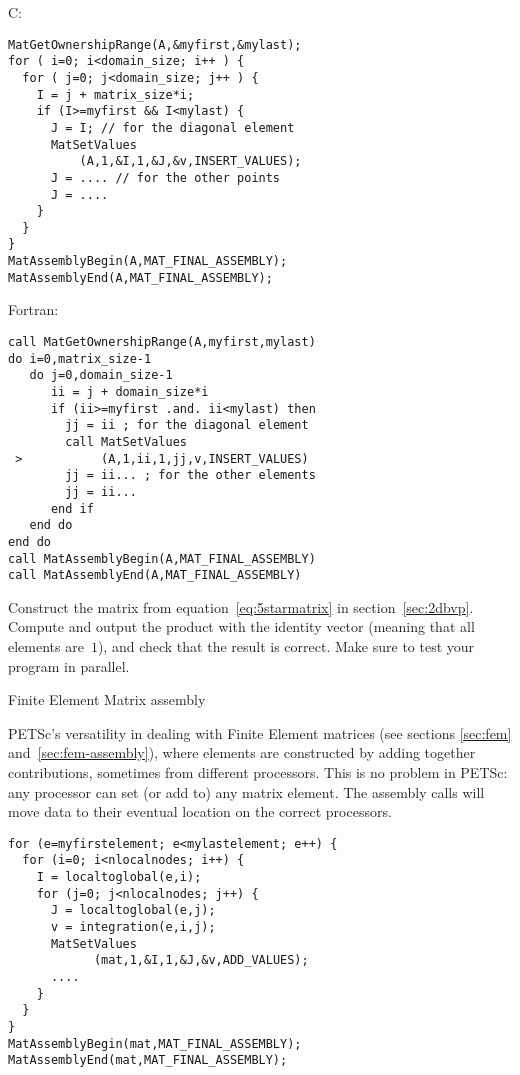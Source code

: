 C:
\begin{verbatim}
MatGetOwnershipRange(A,&myfirst,&mylast);
for ( i=0; i<domain_size; i++ ) {
  for ( j=0; j<domain_size; j++ ) {
    I = j + matrix_size*i;
    if (I>=myfirst && I<mylast) {
      J = I; // for the diagonal element
      MatSetValues
          (A,1,&I,1,&J,&v,INSERT_VALUES);
      J = .... // for the other points
      J = .... 
    }
  }
}
MatAssemblyBegin(A,MAT_FINAL_ASSEMBLY);
MatAssemblyEnd(A,MAT_FINAL_ASSEMBLY);
\end{verbatim}

Fortran:
\begin{verbatim}
call MatGetOwnershipRange(A,myfirst,mylast) 
do i=0,matrix_size-1
   do j=0,domain_size-1
      ii = j + domain_size*i
      if (ii>=myfirst .and. ii<mylast) then
        jj = ii ; for the diagonal element
        call MatSetValues
 >           (A,1,ii,1,jj,v,INSERT_VALUES) 
        jj = ii... ; for the other elements
        jj = ii...
      end if
   end do
end do
call MatAssemblyBegin(A,MAT_FINAL_ASSEMBLY)
call MatAssemblyEnd(A,MAT_FINAL_ASSEMBLY)
\end{verbatim}

\begin{exercise}
  Construct the matrix from equation~\eqref{eq:5starmatrix} in
  section~\ref{sec:2dbvp}. Compute and output the product with the
  identity vector (meaning that all elements are~$1$), and check that
  the result is correct. Make sure to test your program in parallel.
\end{exercise}

 {Finite Element Matrix assembly}

PETSc's versatility in dealing with Finite Element matrices (see
sections \ref{sec:fem} and~\ref{sec:fem-assembly}), where elements are
constructed by adding together contributions, sometimes from different
processors. This is no problem in PETSc: any processor can set (or
add to) any matrix element. The assembly calls will move data to their
eventual location on the correct processors.

\begin{verbatim}
for (e=myfirstelement; e<mylastelement; e++) {
  for (i=0; i<nlocalnodes; i++) {
    I = localtoglobal(e,i);
    for (j=0; j<nlocalnodes; j++) {
      J = localtoglobal(e,j);
      v = integration(e,i,j);
      MatSetValues
            (mat,1,&I,1,&J,&v,ADD_VALUES);
      ....
    }
  }
}
MatAssemblyBegin(mat,MAT_FINAL_ASSEMBLY);
MatAssemblyEnd(mat,MAT_FINAL_ASSEMBLY);
\end{verbatim}

